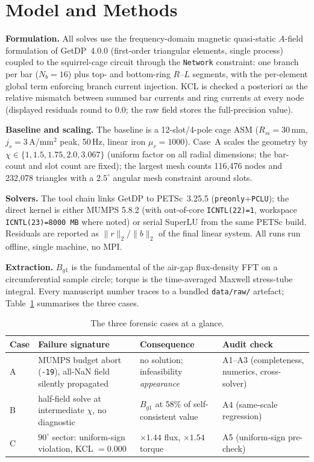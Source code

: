 \documentclass[preprint,12pt]{elsarticle}
\begin{document}
\section{Model and Methods}
\textbf{Formulation.} All solves use the frequency-domain magnetic
quasi-static $A$-field formulation of GetDP~4.0.0 (first-order
triangular elements, single process) coupled to the squirrel-cage
circuit through the \texttt{Network} constraint: one branch per bar
($N_b{=}16$) plus top- and bottom-ring $R$--$L$ segments, with the
per-element global term enforcing branch current injection. KCL is
checked a posteriori as the relative mismatch between summed bar
currents and ring currents at every node (displayed residuals round to
$0.0$; the raw field stores the full-precision value).

\textbf{Baseline and scaling.} The baseline is a 12-slot/4-pole cage
ASM ($R_{si}{=}30$\,mm, $j_s{=}3$\,A/mm$^2$ peak, 50\,Hz, linear
iron $\mu_r{=}1000$). Case~A scales the geometry by
$\chi\in\{1, 1.5, 1.75, 2.0, 3.067\}$ (uniform factor on all radial
dimensions; the bar-count and slot count are fixed); the largest mesh
counts 116{,}476 nodes and 232{,}078 triangles with a $2.5^\circ$
angular mesh constraint around slots.

\textbf{Solvers.} The tool chain links GetDP to PETSc~3.25.5
(\texttt{preonly}+\texttt{PCLU}); the direct kernel is either MUMPS
5.8.2 (with out-of-core \texttt{ICNTL(22)=1}, workspace
\texttt{ICNTL(23)=8000\,MB} where noted) or serial SuperLU from the
same PETSc build. Residuals are reported as $\|r\|_2/\|b\|_2$ of the
final linear system. All runs run offline, single machine, no MPI.

\textbf{Extraction.} $B_{g1}$ is the fundamental of the air-gap
flux-density FFT on a circumferential sample circle; torque is the
time-averaged Maxwell stress-tube integral. Every manuscript number
traces to a bundled \texttt{data/raw/} artefact; Table~\ref{tab:cases}
summarises the three cases.

\begin{table}[t]\centering
\caption{The three forensic cases at a glance.}\label{tab:cases}
\small
\begin{tabular}{@{}p{}p{}p{}p{}@{}}
\hline
Case & Failure signature & Consequence & Audit check \\
\hline
A & MUMPS budget abort (\texttt{-19}), all-NaN field silently propagated & no solution; infeasibility \emph{appearance} & A1--A3 (completeness, numerics, cross-solver) \\
B & half-field solve at intermediate $\chi$, no diagnostic & $B_{g1}$ at 58\% of self-consistent value & A4 (same-scale regression) \\
C & $90^\circ$ sector: uniform-sign violation, KCL $=0.000$ & $\times1.44$ flux, $\times1.54$ torque & A5 (uniform-sign pre-check) \\
\hline
\end{tabular}
\end{table}
\end{document}
